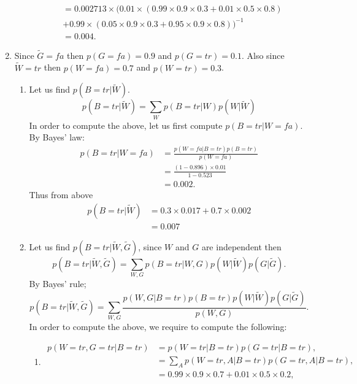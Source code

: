 \documentclass[11pt,a4paper,oneside]{report}
\begin{document}
\begin{enumerate}
\begin{enumerate}
\begin{align}
	&= {0.002713}\times(0.01\times (0.99 \times 0.9 \times 0.3 + 0.01 \times 0.5 \times 0.8) \nonumber \\
	&+0.99\times(0.05 \times 0.9 \times 0.3 + 0.95 \times 0.9 \times 0.8))^{-1}\\
	&= 0.004.
	\end{align}
	\end{enumerate}
	\item Since $\tilde{G} = fa$ then $p(G=fa) = 0.9$ and  $p(G=tr) = 0.1$. Also since $\tilde{W} = tr$ then $p(W=fa) = 0.7$ and $p(W=tr)=0.3$.
	\begin{enumerate}
		\item Let us find $p(B=tr | \tilde{W})$.
		\begin{equation}
		p(B=tr | \tilde{W}) = \sum_{W} p(B= tr|W)p(W |\tilde{W})
		\end{equation}
		In order to compute the above, let us first compute $p(B=tr|W=fa)$. By Bayes' law:
		\begin{align}
		p(B=tr|W=fa) &= \frac{p(W=fa|B=tr)p(B=tr)}{p(W=fa)}\\
		&= \frac{(1-0.896)\times 0.01}{1-0.523}\\
		&= 0.002.
		\end{align}
		Thus from above
		\begin{align}
		p(B=tr | \tilde{W}) &= 0.3\times 0.017 + 0.7 \times 0.002\\
		&=0.007
		\end{align}
		\item
		Let us find $p(B=tr|\tilde{W},\tilde{G})$, since $W$ and $G$ are independent then
		\begin{equation}
		p(B=tr|\tilde{W},\tilde{G}) = \sum_{W,G} {p(B=tr|W,G) p(W|\tilde{W}) p(G|\tilde{G})}.
		\end{equation}
		By Bayes' rule;
		\begin{equation}
		p(B=tr|\tilde{W},\tilde{G}) = \sum_{W,G} \frac{p(W,G|B=tr) p(B=tr) p(W|\tilde{W}) p(G|\tilde{G})}{p(W,G)}.
		\end{equation}
		In order to compute the above, we require to compute the following:
		\begin{enumerate}
			\item
			\begin{align}
			p(W=tr, G=tr|B=tr) &= p(W=tr|B=tr)p(G=tr|B=tr),\\
			&= \sum_{A} p(W=tr, A|B=tr) p(G=tr, A|B=tr),\\
			&= 0.99 \times 0.9 \times 0.7 + 0.01 \times 0.5 \times 0.2,\\

\end{align}
\end{enumerate}
\end{enumerate}
\end{enumerate}
\end{document}
